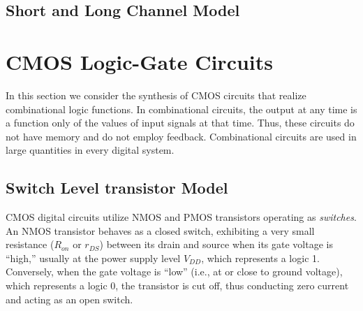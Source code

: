 \documentclass[12pt]{article}
\begin{document}
    \subsection*{Short and Long Channel Model}

    \section{CMOS Logic-Gate Circuits}

    In this section we consider the synthesis of CMOS circuits that realize combinational logic 
    functions. In combinational circuits, the output at any time is a function only of the values 
    of input signals at that time. Thus, these circuits do not have memory and do not employ 
    feedback. Combinational circuits are used in large quantities in every digital system.
    
    \subsection*{Switch Level transistor Model}

    CMOS digital circuits utilize NMOS and PMOS transistors operating as \textit{switches}.
    An NMOS transistor behaves as a closed switch, exhibiting a very small resistance ($R_{on}$ or 
    $r_{DS}$) between its drain and source when its gate voltage is “high,” usually at the power 
    supply level $V_{DD}$, which represents a logic 1. Conversely, when the gate voltage is “low” 
    (i.e., at or close to ground voltage), which represents a logic 0, the transistor is cut off, 
    thus conducting zero current and acting as an open switch.
    
\end{document}
